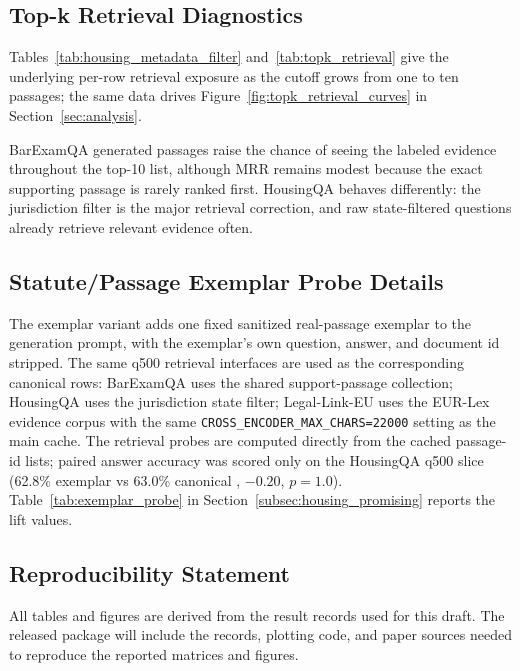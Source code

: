 \FloatBarrier

\subsection{Top-k Retrieval Diagnostics}\label{sec:appendix:topk}

Tables~\ref{tab:housing_metadata_filter} and~\ref{tab:topk_retrieval} give
the underlying per-row retrieval exposure as the cutoff grows from one to
ten passages; the same data drives
Figure~\ref{fig:topk_retrieval_curves} in
Section~\ref{sec:analysis}.





BarExamQA generated passages raise the chance of seeing the labeled
evidence throughout the top-10 list, although MRR remains modest because
the exact supporting passage is rarely ranked first. HousingQA behaves
differently: the jurisdiction filter is the major retrieval correction,
and raw state-filtered questions already retrieve relevant evidence often.

\FloatBarrier

\subsection{Statute/Passage Exemplar Probe Details}\label{sec:appendix:exemplar}

The exemplar variant adds one fixed sanitized real-passage exemplar to the
\hyre{} generation prompt, with the exemplar's own question, answer, and
document id stripped. The same q500 retrieval interfaces are used as
the corresponding canonical \hyre{} rows: BarExamQA uses the shared
support-passage collection; HousingQA uses the jurisdiction state filter;
Legal-Link-EU uses the EUR-Lex evidence corpus with the same
\texttt{CROSS\_ENCODER\_MAX\_CHARS=22000} setting as the main \hyre{}
cache. The retrieval probes are computed directly from the cached
passage-id lists; paired answer accuracy was scored only on the HousingQA
q500 slice (62.8\% exemplar vs 63.0\% canonical \hyre{}, $-0.20$\pp{},
$p=1.0$). Table~\ref{tab:exemplar_probe} in
Section~\ref{subsec:housing_promising} reports the lift values.

\subsection{Reproducibility Statement}

All tables and figures are derived from the result records used for this draft.
The released package will include the records, plotting code, and paper sources
needed to reproduce the reported matrices and figures.
